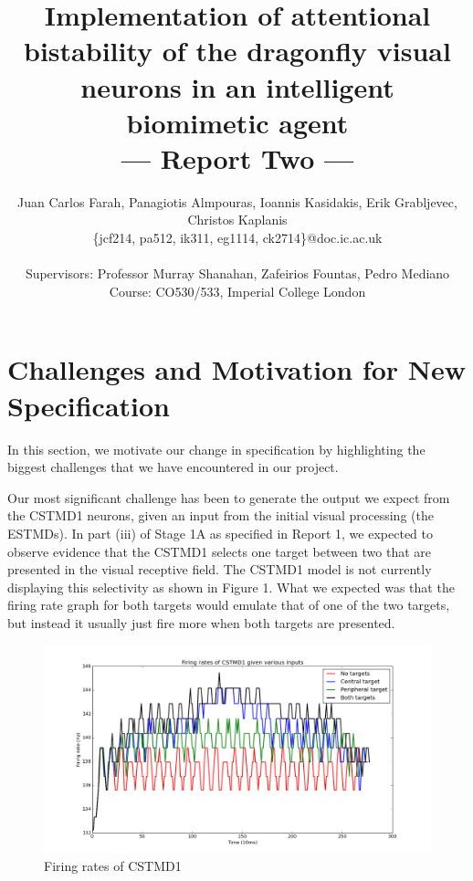 \documentclass[a4paper,11pt]{article}
\title{Implementation of attentional bistability of the dragonfly visual neurons in an intelligent biomimetic agent\\\Large{--- Report Two ---}}
\author{Juan Carlos Farah, Panagiotis Almpouras, Ioannis Kasidakis, Erik Grabljevec, Christos Kaplanis\\
       \{jcf214, pa512, ik311, eg1114, ck2714\}@doc.ic.ac.uk\\ \\
       \small{Supervisors: Professor Murray Shanahan, Zafeirios Fountas, Pedro Mediano}\\
       \small{Course: CO530/533, Imperial College London}
}
\begin{document}
\maketitle
\section{Challenges and Motivation for New Specification}
In this section, we motivate our change in specification by highlighting the biggest challenges that we have encountered in our project. 

Our most significant challenge has been to generate the output we expect from the CSTMD1 neurons, given an input from the initial visual processing (the ESTMDs). In part (iii) of Stage 1A as specified in Report 1, we expected to observe evidence that the CSTMD1 selects one target between two that are presented in the visual receptive field. The CSTMD1 model is not currently displaying this selectivity as shown in Figure 1. What we expected was that the firing rate graph for both targets would emulate that of one of the two targets, but instead it usually just fire more when both targets are presented. 
	\begin{figure}[h]
	\begin{center}
	\includegraphics[scale = 0.3]{firingrates}
	\end{center}
	\caption{Firing rates of CSTMD1}
	\end{figure}	
\end{document}
